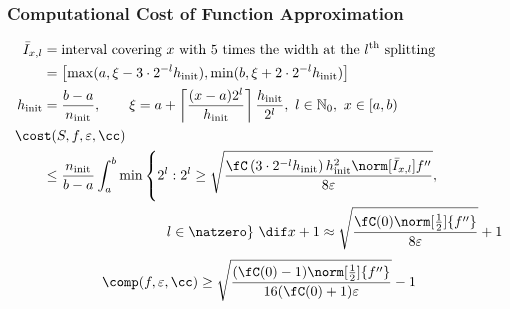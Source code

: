 \documentclass[12pt,compress,xcolor={usenames,dvipsnames}]{beamer} %
\DeclareMathOperator{\init}{init}
\newcommand{\abstol}{\varepsilon}
\begin{document}
\begin{frame}
	\frametitle{Computational Cost of Function Approximation}
	\vspace{-7ex}
	\begin{align*}
	 \bar{I}_{x,l}& =\text{interval covering $x$ with $5$ times the width at the $l^{\text{th}}$ splitting} \\
	 	&= \left[\max(a,\xi -3\cdot 2^{-l} h_{\init}),  \min(b, \xi +2 \cdot 2^{-l} h_{\init})\right] \\
h_{\init}  &= \frac{b-a}{n_{\init}}, \qquad	\xi= a + \left\lceil\frac{(x-a)2^l}{h_{\init}}\right\rceil \frac{h_{\init}}{2^l}, \ l \in \mathbb{N}_0, \ x \in [a,b) \\
	\MoveEqLeft{\cost(S,f,\varepsilon,\cc)} \\
	&\le \frac{n_{\init}}{b-a}\int_a^b \min\left\{2^l:  2^l \ge \sqrt{\frac{\fC\left(3\cdot 2^{-l} h_{\init}\right) h_{\init}^2 \norm[\bar{I}_{x,l}]{f''} }{8 \abstol}}, \right .\\
	&\hspace{20ex}\left .  l \in  \natzero\right\} \, \dif x + 1 \approx \sqrt{\frac{\fC(0) \norm[\frac 12]{f''}}{8\abstol}} +1 
	\end{align*}
	\begin{equation*}
	\comp(f,\varepsilon,\cc) \ge \sqrt{\frac{(\fC(0)-1)  \norm[\frac12]{f''} }{16(\fC(0)+1)\varepsilon}} -1
	\end{equation*}
\end{frame}
\end{document}
